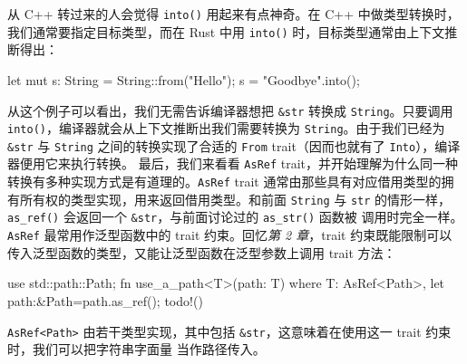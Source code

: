 从 C++ 转过来的人会觉得 \texttt{into()} 用起来有点神奇。在 C++ 中做类型转换时，我们通常要指定目标类型，而在 Rust 中用 \texttt{into()} 时，目标类型通常由上下文推断得出：
\begin{codebox}[rust]
let mut s: String = String::from("Hello");
s = "Goodbye".into();
\end{codebox}
\label{idx:idx_9759ad22}
从这个例子可以看出，我们无需告诉编译器想把 \texttt{\&str} 转换成 \texttt{String}。只要调用 \texttt{into()}，编译器就会从上下文推断出我们需要转换为 \texttt{String}。由于我们已经为 \texttt{\&str} 与 \texttt{String} 之间的转换实现了合适的 \texttt{From} trait（因而也就有了 \texttt{Into}），编译器便用它来执行转换。
最后，我们来看看 \texttt{AsRef} trait，并开始理解为什么同一种转换有多种实现方式是有道理的。\texttt{AsRef} trait 通常由那些具有对应借用类型的拥有所有权的类型实现，用来返回借用类型。和前面 \texttt{String} 与 \texttt{str} 的情形一样，
\texttt{as\_ref()} 会返回一个 \texttt{\&str}，与前面讨论过的 \texttt{as\_str()} 函数被
调用时完全一样。
\texttt{AsRef} 最常用作泛型函数中的 trait 约束。回忆\emph{第 2 章}，trait
约束既能限制可以传入泛型函数的类型，又能让泛型函数在泛型参数上调用 trait 方法：
\begin{codebox}[rust]
use std::path::Path;
fn use_a_path<T>(path: T)
where
    T: AsRef<Path>,
{
    let path:&Path=path.as_ref();
    todo!()
}
\end{codebox}
\label{idx:idx_e5e89b05}
\texttt{AsRef<Path>} 由若干类型实现，其中包括 \texttt{\&str}，这意味着在使用这一 trait 约束时，我们可以把字符串字面量
当作路径传入。
